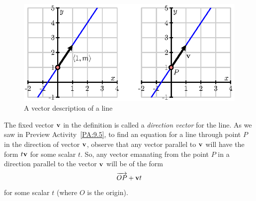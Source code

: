 \begin{figure}[ht]
  \begin{center}
    \includegraphics{figures/fig_9_5_line_slope.eps}
    \caption{A vector description of a line}
    \label{F:9.5.line}
  \end{center}
\end{figure}

\vspace*{5pt}
\nin {}
\vspace*{5pt}

The fixed vector $\mathbf{v}$ in the definition is called a
\emph{direction vector} for the line. As
we saw in Preview Activity~\ref{PA:9.5}, to find an equation for a
line through point $P$ in the direction of vector $\mathbf{v}$, observe that
any vector parallel to $\mathbf{v}$ will have the form $t \mathbf{v}$ for some
scalar $t$. So, any vector emanating from the point $P$ in a direction
parallel to the vector $\mathbf{v}$ will be of the form
\begin{equation} \label{eq:9.5.lines_1}
\overrightarrow{OP} + \mathbf{v} t
\end{equation}
for some scalar $t$ (where $O$ is the origin).

